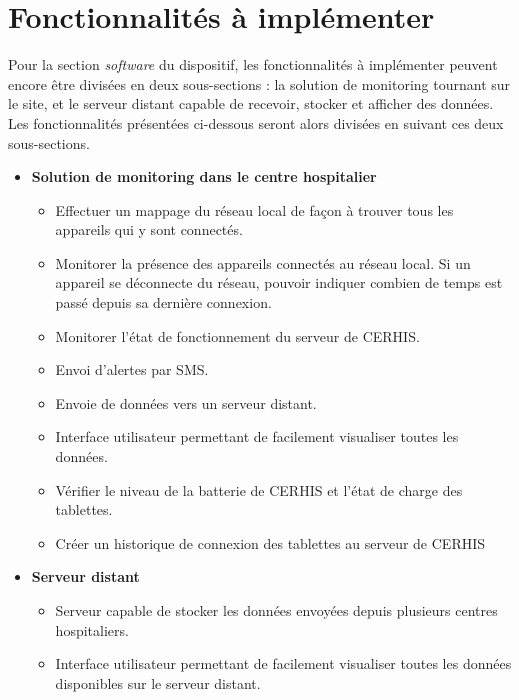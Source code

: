 \section{Fonctionnalités à implémenter}
\label{sec:cahier_soft}

Pour la section \textit{software} du dispositif, les fonctionnalités à implémenter peuvent encore être divisées en deux sous-sections : la solution de monitoring tournant sur le site, et le serveur distant capable de recevoir, stocker et afficher des données. Les fonctionnalités présentées ci-dessous seront alors divisées en suivant ces deux sous-sections.


\begin{itemize}
  \item \textbf{Solution de monitoring dans le centre hospitalier}
  \begin{itemize}
    \item Effectuer un mappage du réseau local de façon à trouver tous les appareils qui y sont connectés.

    \item Monitorer la présence des appareils connectés au réseau local. Si un appareil se déconnecte du réseau, pouvoir indiquer combien de temps est passé depuis sa dernière connexion.

    \item Monitorer l’état de fonctionnement du serveur de CERHIS.

    \item Envoi d’alertes par SMS.

    \item Envoie de données vers un serveur distant.

    \item Interface utilisateur permettant de facilement visualiser toutes les données.

    \item Vérifier le niveau de la batterie de CERHIS et l’état de charge des tablettes.

    \item Créer un historique de connexion des tablettes au serveur de CERHIS
  \end{itemize}

  \item \textbf{Serveur distant}
  \begin{itemize}
    \item Serveur capable de stocker les données envoyées depuis plusieurs centres hospitaliers.

    \item Interface utilisateur permettant de facilement visualiser toutes les données disponibles sur le serveur distant.
  \end{itemize}
\end{itemize}



